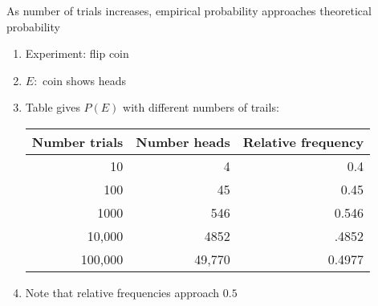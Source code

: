 \documentclass{ximera}
\begin{document}
\begin{enumerate}
\begin{theorem}
As number of trials increases, empirical probability
approaches theoretical probability
\end{theorem}

\begin{example}
\begin{enumerate}
\item Experiment: flip coin
\item $E:$ coin shows heads
\item Table gives $P\left(E\right)$ with different numbers of trails:
\begin{center}\begin{tabular}{rrr}
Number trials&Number heads&Relative frequency\\\toprule
10&4&0.4\\
100&45&0.45\\
1000&546&0.546\\
10,000&4852&.4852\\
100,000&49,770&0.4977
\end{tabular}\end{center}
\item Note that relative frequencies approach $0.5$
\end{enumerate}
\end{example}

\end{enumerate}
\end{document}
